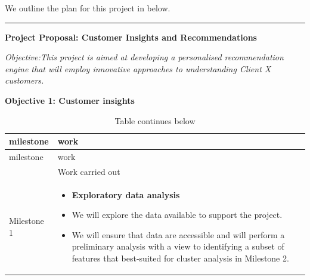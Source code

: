 \documentclass[
]{book}
\providecommand{\tightlist}{%
  \setlength{\itemsep}{0pt}\setlength{\parskip}{0pt}}
\begin{document}
We outline the plan for this project in below.

\begin{center}\rule{0.5\linewidth}{0.5pt}\end{center}

\textbf{Project Proposal: Customer Insights and Recommendations}

\emph{Objective:This project is aimed at developing a personalised recommendation engine that will employ innovative approaches to understanding Client X customers.}

\textbf{Objective 1: Customer insights}

\begin{longtable}[]{@{}ll@{}}
\caption{Table continues below}\tabularnewline
\toprule
\begin{minipage}[b]{0.18\columnwidth}\raggedright
milestone\strut
\end{minipage} & \begin{minipage}[b]{0.43\columnwidth}\raggedright
work\strut
\end{minipage}\tabularnewline
\midrule
\endfirsthead
\toprule
\begin{minipage}[b]{0.18\columnwidth}\raggedright
milestone\strut
\end{minipage} & \begin{minipage}[b]{0.43\columnwidth}\raggedright
work\strut
\end{minipage}\tabularnewline
\midrule
\endhead
\begin{minipage}[t]{0.18\columnwidth}\raggedright
\strut
\end{minipage} & \begin{minipage}[t]{0.43\columnwidth}\raggedright
Work carried out\strut
\end{minipage}\tabularnewline
\begin{minipage}[t]{0.18\columnwidth}\raggedright
Milestone 1\strut
\end{minipage} & \begin{minipage}[t]{0.43\columnwidth}\raggedright
\begin{itemize}
\tightlist
\item
  \textbf{Exploratory data
  analysis}
\item
  We will explore the data
  available to support the
  project.
\item
  We will ensure that data
  are accessible and will
  perform a preliminary analysis
  with a view to identifying a
  subset of features that
  best-suited for cluster
  analysis in Milestone 2.
\end{itemize}\strut

\end{minipage}
\end{longtable}
\end{document}
